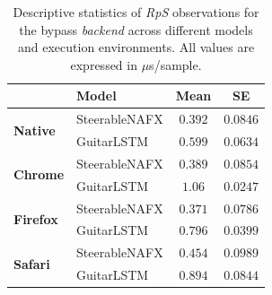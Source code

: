 \begin{table}[htbp]
\caption{Descriptive statistics of \emph{RpS} observations for the bypass \emph{backend} across different models and execution environments. All values are expressed in $\mu$s/sample.}
\label{tab:runtime-overview}
\centering
\setlength{\tabcolsep}{3pt}
\begin{tabular}{llcc}
\toprule
& \textbf{Model} & \textbf{Mean} & \textbf{SE} \\
\midrule
  \multirow{2}{*}{\textbf{Native}} & SteerableNAFX & $0.392$ & $0.0846$ \\
   & GuitarLSTM & $0.599$ & $0.0634$ \\
\midrule
  \multirow{2}{*}{\textbf{Chrome}} & SteerableNAFX & $0.389$ & $0.0854$ \\
   & GuitarLSTM & $1.06$ & $0.0247$ \\
\midrule
  \multirow{2}{*}{\textbf{Firefox}} & SteerableNAFX & $0.371$ & $0.0786$ \\
   & GuitarLSTM & $0.796$ & $0.0399$ \\
\midrule
  \multirow{2}{*}{\textbf{Safari}} & SteerableNAFX & $0.454$ & $0.0989$ \\
   & GuitarLSTM & $0.894$ & $0.0844$ \\
\bottomrule
\end{tabular}
\end{table}
